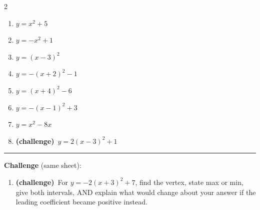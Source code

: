 \documentclass[12pt]{article}
\begin{document}
\begin{multicols}{2}
\begin{enumerate}[label=\textbf{\arabic*.}, start=1, itemsep=3cm]
  \item $\displaystyle y=x^{2}+5$
  \item $\displaystyle y=-x^{2}+1$
  \item $\displaystyle y=(x-3)^{2}$
  \item $\displaystyle y=-(x+2)^{2}-1$
  \item $\displaystyle y=(x+4)^{2}-6$
  \item $\displaystyle y=-(x-1)^{2}+3$
  \item $\displaystyle y=x^{2}-8x$
  \item \textbf{(challenge)}\ $\displaystyle y=2(x-3)^{2}+1$
\end{enumerate}
\end{multicols}

\vspace{0.2cm}\hrule\vspace{0.3cm}
\textbf{Challenge} (same sheet):\\[4pt]
\begin{enumerate}[label=\textbf{\arabic*.}, start=9, itemsep=2.2cm]
  \item \textbf{(challenge)}\ For $y=-2(x+3)^{2}+7$, find the vertex, state max or min, give both intervals, AND explain what would change about your answer if the leading coefficient became positive instead.
\end{enumerate}

\newpage
\end{document}
